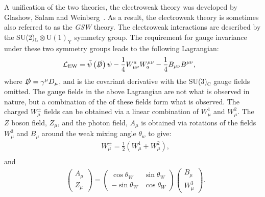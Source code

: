 A unification of the two theories, the electroweak theory was developed by Glashow, Salam and Weinberg~\cite{Glashow1959,Salam1959,Weinberg1967}. As a result, the electroweak theory is sometimes also referred to as the \emph{GSW} theory. The electroweak interactions are described by the SU(2)$_\mathrm{L}\otimes\mathrm{U(1)}_\mathrm{Y}$ symmetry group. The requirement for gauge invariance under these two symmetry groups leads to the following Lagrangian:
\begin{equation}
    \label{eq:lagrangianEW}
    \begin{aligned}
        & \mathcal{L}_\mathrm{EW} = \bar{\psi}\left(\slashed{D}\right)\psi - \frac{1}{4}W^a_{\mu\nu}W_a^{\mu\nu} - \frac{1}{4}B_{\mu\nu}B^{\mu\nu},
     \end{aligned}
\end{equation}
where $\slashed{D} = \gamma^\mu D_\mu$, and is the covariant derivative with the SU(3)$_\mathrm{C}$ gauge fields omitted. The gauge fields in the above Lagrangian are not what is observed in nature, but a combination of the of these fields form what is observed. The charged $W^\pm_\mu$ fields can be obtained via a linear combination of $W^1_\mu$ and $W^2_\mu$. The $Z$ boson field, $Z_\mu$, and the photon field, $A_\mu$ is obtained via rotations of the fields $W_\mu^3$ and $B_\mu$ around the weak mixing angle $\theta_w$ to give:
\begin{equation}\renewcommand*{\arraystretch}{\newarraystrech}
    \label{eq:wbosonFields}
    \begin{aligned}
        & W^\pm_\mu = \frac{1}{2} \left(W^1_\mu + W^2_\mu \right), \\
     \end{aligned}
\end{equation}
and 
\begin{equation}\renewcommand*{\arraystretch}{\newarraystrech}
    \label{eq:zbosonFields}
    \begin{aligned}
        & \begin{pmatrix}
            A_\mu \\
            Z_\mu
        \end{pmatrix} = \begin{pmatrix}
            \cos \theta_W & \sin \theta_W \\
            -\sin \theta_W & \cos \theta_W
        \end{pmatrix} \begin{pmatrix}
            B_\mu \\
            W_\mu^3
        \end{pmatrix}.
     \end{aligned}
\end{equation}

